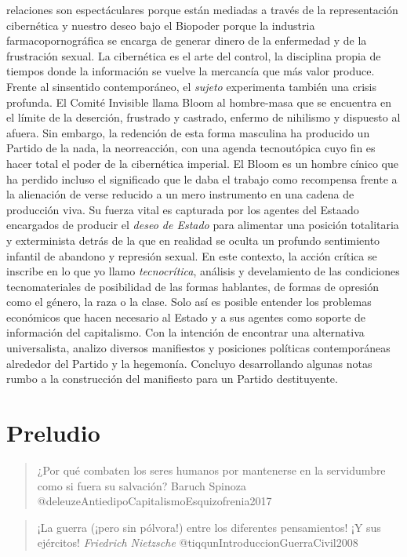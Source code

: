 \documentclass[
]{article}
\begin{document}
relaciones son espectáculares porque están mediadas a través de la
representación cibernética y nuestro deseo bajo el Biopoder porque la
industria farmacopornográfica se encarga de generar dinero de la
enfermedad y de la frustración sexual. La cibernética es el arte del
control, la disciplina propia de tiempos donde la información se vuelve
la mercancía que más valor produce. Frente al sinsentido contemporáneo,
el \emph{sujeto} experimenta también una crisis profunda. El Comité
Invisible llama Bloom al hombre-masa que se encuentra en el límite de la
deserción, frustrado y castrado, enfermo de nihilismo y dispuesto al
afuera. Sin embargo, la redención de esta forma masculina ha producido
un Partido de la nada, la neorreacción, con una agenda tecnoutópica cuyo
fin es hacer total el poder de la cibernética imperial. El Bloom es un
hombre cínico que ha perdido incluso el significado que le daba el
trabajo como recompensa frente a la alienación de verse reducido a un
mero instrumento en una cadena de producción viva. Su fuerza vital es
capturada por los agentes del Estaado encargados de producir el
\emph{deseo de Estado} para alimentar una posición totalitaria y
exterminista detrás de la que en realidad se oculta un profundo
sentimiento infantil de abandono y represión sexual. En este contexto,
la acción crítica se inscribe en lo que yo llamo \emph{tecnocrítica},
análisis y develamiento de las condiciones tecnomateriales de
posibilidad de las formas hablantes, de formas de opresión como el
género, la raza o la clase. Solo así es posible entender los problemas
económicos que hacen necesario al Estado y a sus agentes como soporte de
información del capitalismo. Con la intención de encontrar una
alternativa universalista, analizo diversos manifiestos y posiciones
políticas contemporáneas alrededor del Partido y la hegemonía. Concluyo
desarrollando algunas notas rumbo a la construcción del manifiesto para
un Partido destituyente.

\hypertarget{preludio}{%
\section{Preludio}\label{preludio}}

\begin{quote}
¿Por qué combaten los seres humanos por mantenerse en la servidumbre
como si fuera su salvación? Baruch Spinoza
@deleuzeAntiedipoCapitalismoEsquizofrenia2017
\end{quote}

\begin{quote}
¡La guerra (¡pero sin pólvora!) entre los diferentes pensamientos! ¡Y
sus ejércitos! \emph{Friedrich Nietzsche}
@tiqqunIntroduccionGuerraCivil2008
\end{quote}
\end{document}
